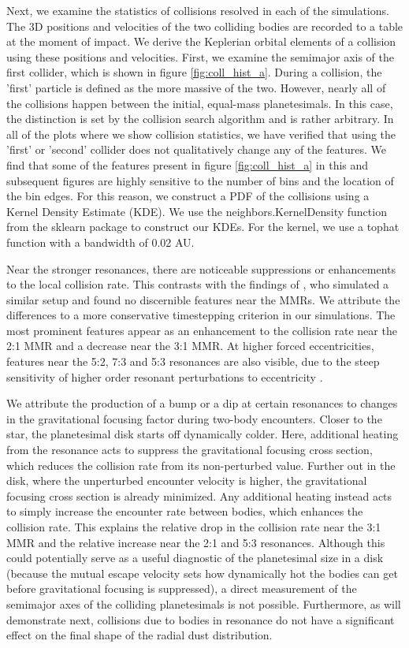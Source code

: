 \documentclass[twocolumn]{aastex63}
\begin{document}
Next, we examine the statistics of collisions resolved in each of the simulations. The 3D positions and velocities of the two colliding bodies are 
recorded to a table at the moment of impact. We derive the Keplerian orbital elements of a collision using these positions and velocities. 
First, we examine the semimajor axis of the first collider, which is shown in figure \ref{fig:coll_hist_a}. During a collision, the 'first' particle is defined 
as the more massive of the two. However, nearly all of the collisions happen between the initial, equal-mass planetesimals. In this case, the 
distinction is set by the collision search algorithm and is rather arbitrary. In all of the plots where we show collision statistics, we have verified that 
using the 'first' or 'second' collider does not qualitatively change any of the features. We find that some of the features present in figure 
\ref{fig:coll_hist_a} in this and subsequent figures are highly sensitive to the number of bins and the location of the bin edges. For this reason, we 
construct a PDF of the collisions using a Kernel Density Estimate (KDE). We use the {\sc neighbors.KernelDensity} function from the {\sc sklearn} 
\citep{scikit-learn} package to construct our KDEs. For the kernel, we use a tophat function with a bandwidth of 0.02 AU.

Near the stronger resonances, there are noticeable suppressions or enhancements to the local collision rate. This contrasts with the findings of 
\citet{2000Icar..143...45R}, who simulated a similar setup and found no discernible features near the MMRs. We attribute the differences to a more 
conservative timestepping criterion in our simulations. The most prominent features appear as an enhancement to the collision rate near the 2:1 
MMR and a decrease near the 3:1 MMR. At higher forced eccentricities, features near the 5:2, 7:3 and 5:3 resonances are also visible, due to the 
steep sensitivity of higher order resonant perturbations to eccentricity \citep{1994PhyD...77..289M}.

We attribute the production of a bump or a dip at certain resonances to changes in the gravitational focusing factor during two-body encounters. 
Closer to the star, the planetesimal disk starts off dynamically colder. Here, additional heating from the resonance acts to suppress the gravitational 
focusing cross section, which reduces the collision rate from its non-perturbed value. Further out in the disk, where the unperturbed encounter velocity is higher, the gravitational focusing cross section is already minimized. Any additional heating instead acts to simply increase the encounter rate between bodies, which enhances the collision rate. This explains the relative drop in the collision rate near the 3:1 MMR and the relative increase near the 2:1 and 5:3 resonances. Although this could potentially serve as a useful diagnostic of the planetesimal size in a disk (because the mutual escape velocity sets how dynamically hot the bodies can get before gravitational focusing is suppressed), a direct measurement of the semimajor axes of the colliding planetesimals is not possible. Furthermore, as will demonstrate next, collisions due to bodies in resonance do not have a significant effect on the final shape of the radial dust distribution.
\end{document}
